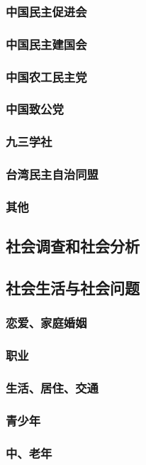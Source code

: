 \documentclass[UTF8]{../RepresentationUniverse}
\begin{document}
    \subsubsection{中国民主促进会}
    \subsubsection{中国民主建国会}
    \subsubsection{中国农工民主党}
    \subsubsection{中国致公党}
    \subsubsection{九三学社}
    \subsubsection{台湾民主自治同盟}
    \subsubsection{其他}

\subsection{社会调查和社会分析}
\subsection{社会生活与社会问题}
    \subsubsection{恋爱、家庭婚姻}
    \subsubsection{职业}
    \subsubsection{生活、居住、交通}
    \subsubsection{青少年}
    \subsubsection{中、老年}
\end{document}
